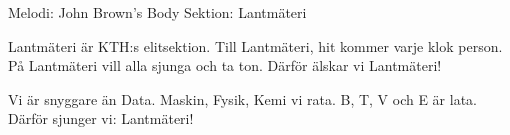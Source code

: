 \begin{song}

\begin{songmeta}
Melodi: John Brown's Body
Sektion: Lantmäteri
\end{songmeta}

\begin{songtext}
Lantmäteri är KTH:s elitsektion.
Till Lantmäteri, hit kommer varje klok person.
På Lantmäteri vill alla sjunga och ta ton.
Därför älskar vi Lantmäteri!

Vi är snyggare än Data.
Maskin, Fysik, Kemi vi rata.
B, T, V och E är lata.
Därför sjunger vi: Lantmäteri!
\end{songtext}

\end{song}
